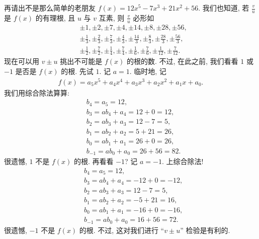 \begin{example}
    再请出不是那么简单的老朋友 $f(x) = 12 x^5-7 x^3+21 x^2+56$. 我们也知道, 若 $\frac{v}{u}$ 是 $f(x)$ 的有理根, 且 $u$ 与 $v$ 互素, 则 $\frac{v}{u}$ 必形如
    \begin{align*}
         & {\pm 1}, {\pm 2}, {\pm 7}, {\pm 4}, {\pm 14}, {\pm 8}, {\pm 28}, {\pm 56},                                                                                 \\
         & {\pm \frac{1}{3}}, {\pm \frac{2}{3}}, {\pm \frac{7}{3}}, {\pm \frac{4}{3}}, {\pm \frac{14}{3}}, {\pm \frac{8}{3}}, {\pm \frac{28}{3}}, {\pm \frac{56}{3}}, \\
         & {\pm \frac{1}{2}}, {\pm \frac{7}{2}}, {\pm \frac{1}{4}}, {\pm \frac{7}{4}}, {\pm \frac{1}{6}}, {\pm \frac{7}{6}}, {\pm \frac{1}{12}}, {\pm \frac{7}{12}}.
    \end{align*}
    现在可以用 $v \pm u$ 挑出不可能是 $f(x)$ 的根的数. 不过, 在此之前, 我们看看 $1$ 或 $-1$ 是否是 $f(x)$ 的根. 先试 $1$. 记 $a = 1$. 临时地, 记
    \begin{align*}
        f(x) = a_5 x^5 + a_4 x^4 + a_3 x^3 + a_2 x^2 + a_1 x + a_0.
    \end{align*}
    我们用综合除法算算:
    \begin{align*}
         & b_4 = a_5 = 12,                      \\
         & b_3 = a b_4 + a_4 = 12 + 0 = 12,     \\
         & b_2 = a b_3 + a_3 = 12 - 7 = 5,      \\
         & b_1 = a b_2 + a_2 = 5 + 21 = 26,     \\
         & b_0 = a b_1 + a_1 = 26 + 0 = 26,     \\
         & b_{-1} = a b_0 + a_0 = 26 + 56 = 82.
    \end{align*}
    很遗憾, $1$ 不是 $f(x)$ 的根. 再看看 $-1$? 记 $a = -1$. 上综合除法!
    \begin{align*}
         & b_4 = a_5 = 12,                      \\
         & b_3 = a b_4 + a_4 = -12 + 0 = -12,   \\
         & b_2 = a b_3 + a_3 = 12 - 7 = 5,      \\
         & b_1 = a b_2 + a_2 = -5 + 21 = 16,    \\
         & b_0 = a b_1 + a_1 = -16 + 0 = -16,   \\
         & b_{-1} = a b_0 + a_0 = 16 + 56 = 72.
    \end{align*}
    很遗憾, $-1$ 不是 $f(x)$ 的根. 不过, 这对我们进行 ``$v \pm u$'' 检验是有利的.


\end{example}
